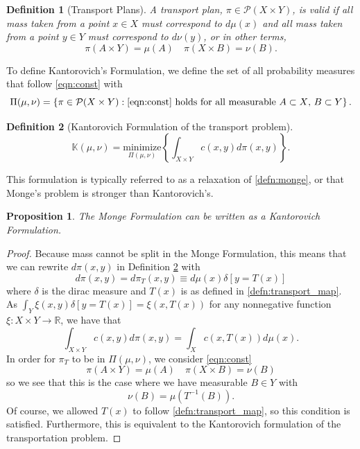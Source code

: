 \documentclass[12pt]{article}
\theoremstyle{plain}
\newtheorem{prop}{Proposition}[section]
\newtheorem{defn}{Definition}[section]
\numberwithin{equation}{section}
\begin{document}
\begin{defn}[Transport Plans]
  A transport plan, $\pi \in \mathcal{P}(X\times Y)$, is valid if all mass taken from a point $x\in X$ must correspond to $d\mu(x)$ and all mass taken from a point $y\in Y$ must correspond to $d\nu(y)$, or in other terms,
  \begin{equation}\label{eqn:const}
    \pi(A\times Y) = \mu(A)\quad \pi(X\times B) = \nu(B).
  \end{equation}
\end{defn}
To define  Kantorovich's Formulation, we define the set of all probability measures that follow \autoref{eqn:const} with
\begin{equation}
  \Pi(\mu,\nu) = \left\{\pi\in \mathcal{P}(X\times Y): \text{\autoref{eqn:const} holds for all measurable $A\subset X$, $B\subset Y$}\right\}.
\end{equation}
\begin{defn}[Kantorovich Formulation of the transport problem]\label{defn:kantorovich}
  \begin{equation}
    \mathbb{K}(\mu,\nu) = \underset{\Pi(\mu,\nu)}{\text{minimize}}\left\{\int_{X\times Y} c(x,y)d\pi(x,y)\right\}.
  \end{equation}
\end{defn}
This formulation is typically referred to as a relaxation of \autoref{defn:monge}, or that Monge's problem is stronger than Kantorovich's.
\begin{prop}\label{prop:equiv}
  The Monge Formulation can be written as a Kantorovich Formulation.
\end{prop}
\begin{proof}
  Because mass cannot be split in the Monge Formulation, this means that we can rewrite $d\pi(x,y)$ in Definition \ref{defn:kantorovich}
  with
  \[ d\pi(x,y)=d\pi_T(x,y) \equiv d\mu(x)\delta[y=T(x)]\]
  where $\delta$ is the dirac measure and $T(x)$ is as defined in \autoref{defn:transport_map}. As $\int_Y\xi(x,y)\delta[y=T(x)] = \xi(x,T(x))$ for any nonnegative function $\xi:X\times Y\to \mathbb{R}$, we have that 
  \[ \int_{X\times Y}c(x,y)d\pi(x,y) = \int_X c(x,T(x))d\mu(x).\]
  In order for $\pi_T$ to be in $\Pi(\mu,\nu)$, we consider \autoref{eqn:const}
  \[\pi(A\times Y) = \mu(A)\quad \pi(X \times B) = \nu(B)\]
  so we see that this is the case where we have measurable $B\in Y$ with 
  \[\nu(B) = \mu(T^{-1}(B)).\]
  Of course, we allowed $T(x)$ to follow \autoref{defn:transport_map}, so this condition is satisfied. Furthermore, this is equivalent to the Kantorovich formulation of the transportation problem.
\end{proof}
\end{document}
